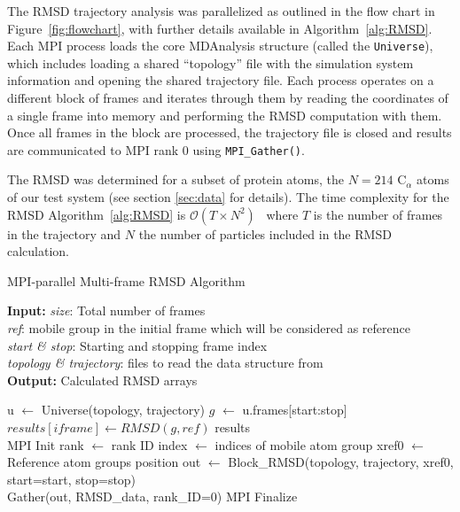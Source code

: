 The RMSD trajectory analysis was parallelized as outlined in the flow chart in Figure~\ref{fig:flowchart}, with further details available in Algorithm~\ref{alg:RMSD}.
Each MPI process loads the core MDAnalysis structure (called the \texttt{Universe}), which includes loading a shared ``topology'' file with the simulation system information and opening the shared trajectory file.
Each process operates on a different block of frames and iterates through them by reading the coordinates of a single frame into memory and performing the RMSD computation with them.
Once all frames in the block are processed, the trajectory file is closed and results are communicated to MPI rank 0 using \texttt{MPI\_Gather()}.

The RMSD was determined for a subset of protein atoms, the $N=214$  C$_{\alpha}$ atoms of our test system (see section \ref{sec:data} for details).
The time complexity for the RMSD Algorithm~\ref{alg:RMSD} is $\mathcal{O}(T \times N^{2})$~\cite{Liu:2010kx} where $T$ is the number of frames in the trajectory and $N$ the number of particles included in the RMSD calculation.

\begin{algorithm}[ht!]
	\scriptsize
	\caption{MPI-parallel Multi-frame RMSD Algorithm}
	\label{alg:RMSD}
	\hspace*{\algorithmicindent} \textbf{Input:} \emph{size}: Total number of frames \\
	\hspace*{\algorithmicindent} \emph{ref}: mobile group in the initial frame which will be considered as reference \\
	\hspace*{\algorithmicindent} \emph{start \& stop}: Starting and stopping frame index\\
	\hspace*{\algorithmicindent} \emph{topology \& trajectory}: files to read the data structure from \\
	\hspace*{\algorithmicindent} \textbf{Output:} Calculated RMSD arrays
	\begin{algorithmic}[1]
		\State u $\leftarrow$ Universe(topology, trajectory)
		\State $g$ $\leftarrow$ u.frames[start:stop]
		\State $results[iframe] \leftarrow RMSD(g, ref)$
		\EndFor
		\State \Return results
		\EndProcedure
		\\        
		\State MPI Init
		\State rank $\leftarrow$ rank ID
		\State index $\leftarrow$ indices of mobile atom group
		\State xref0 $\leftarrow$ Reference atom group\textsc{}s position
		\State out $\leftarrow$ Block\_RMSD(topology, trajectory, xref0, start=start, stop=stop)
		\\
		\State Gather(out, RMSD\_data, rank\_ID=0)
		\State MPI Finalize
	\end{algorithmic}
\end{algorithm}


